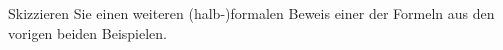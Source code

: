 
\begin{exercise}[110]

Skizzieren Sie einen weiteren (halb-)formalen Beweis einer der Formeln aus den vorigen
beiden Beispielen.

\end{exercise}


\begin{solution}

\phantom{}

\end{solution}

